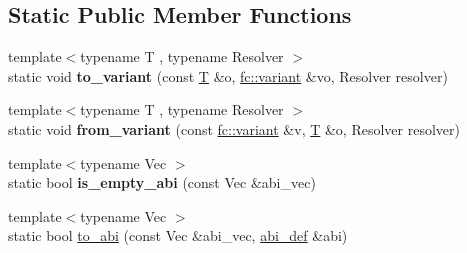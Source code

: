 \subsection*{Static Public Member Functions}
\begin{DoxyCompactItemize}
\item 
\mbox{\label{structaacio_1_1chain_1_1contracts_1_1abi__serializer_a14d77c9f2f898bc5ecae58611316a849}} 
{\footnotesize template$<$typename T , typename Resolver $>$ }\\static void {\bfseries to\+\_\+variant} (const \mbox{\hyperlink{struct_t}{T}} \&o, \mbox{\hyperlink{classfc_1_1variant}{fc\+::variant}} \&vo, Resolver resolver)
\item 
\mbox{\label{structaacio_1_1chain_1_1contracts_1_1abi__serializer_a0ab9e98dbdbce4d24fc5f0199fbe903d}} 
{\footnotesize template$<$typename T , typename Resolver $>$ }\\static void {\bfseries from\+\_\+variant} (const \mbox{\hyperlink{classfc_1_1variant}{fc\+::variant}} \&v, \mbox{\hyperlink{struct_t}{T}} \&o, Resolver resolver)
\item 
\mbox{\label{structaacio_1_1chain_1_1contracts_1_1abi__serializer_a3872efb2a0ee4ad4c0e393cb3fd06a48}} 
{\footnotesize template$<$typename Vec $>$ }\\static bool {\bfseries is\+\_\+empty\+\_\+abi} (const Vec \&abi\+\_\+vec)
\item 
{\footnotesize template$<$typename Vec $>$ }\\static bool \mbox{\hyperlink{structaacio_1_1chain_1_1contracts_1_1abi__serializer_aaf369a687091d721f89734874053838c}{to\+\_\+abi}} (const Vec \&abi\+\_\+vec, \mbox{\hyperlink{structaacio_1_1chain_1_1contracts_1_1abi__def}{abi\+\_\+def}} \&abi)
\end{DoxyCompactItemize}
